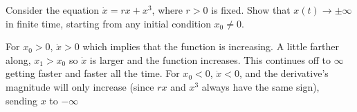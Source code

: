 \documentclass[11pt,answers]{exam}
\begin{document}
\begin{questions}
\item Consider the equation $\dot{x} = rx + x^3$, where $r > 0$ is fixed. Show that $x(t) \to \pm\infty$ in finite time,
starting from any initial condition $x_0 \neq 0$.

\begin{solution}
For $x_0 > 0$, $\dot{x} > 0$ which implies that the function is increasing.  A little farther along, $x_1 > x_0$ so $\dot{x}$ is larger and the function increases.  This continues off to $\infty$ getting faster and faster all the time.
\newline For $x_0 < 0$, $\dot{x} < 0$, and the derivative's magnitude will only increase (since $rx$ and $x^3$ always have the same sign), sending $x$ to $-\infty$
\end{solution}

\end{questions}
\end{document}
